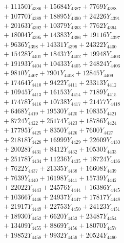 \documentclass[a4paper,10pt]{article}
\begin{document}
{\begin{align}
&\;  + 11150 Y_{4386} + 15684 Y_{4387} + 7769 Y_{4388} \\[0.3ex]
&\;  + 10770 Y_{4389} + 18895 Y_{4390} + 24226 Y_{4391} \\[0.3ex]
&\;  + 20163 Y_{4392} + 10379 Y_{4393} + 7762 Y_{4394} \\[0.3ex]
&\;  + 18004 Y_{4395} + 14383 Y_{4396} + 19116 Y_{4397} \\[0.3ex]
&\;  + 9636 Y_{4398} + 14331 Y_{4399} + 24322 Y_{4400} \\[0.3ex]
&\;  + 15428 Y_{4401} + 18437 Y_{4402} + 19948 Y_{4403} \\[0.3ex]
&\;  + 19193 Y_{4404} + 10433 Y_{4405} + 24824 Y_{4406} \\[0.3ex]
&\;  + 9810 Y_{4407} + 7901 Y_{4408} + 12845 Y_{4409} \\[0.5ex]\allowbreak
&\;  + 17464 Y_{4410} + 9422 Y_{4411} + 23313 Y_{4412} \\[0.3ex]
&\;  + 10945 Y_{4413} + 16153 Y_{4414} + 7189 Y_{4415} \\[0.3ex]
&\;  + 17478 Y_{4416} + 10738 Y_{4417} + 21477 Y_{4418} \\[0.3ex]
&\;  + 6468 Y_{4419} + 19530 Y_{4420} + 10835 Y_{4421} \\[0.3ex]
&\;  + 8724 Y_{4422} + 25174 Y_{4423} + 18786 Y_{4424} \\[0.3ex]
&\;  + 17795 Y_{4425} + 8350 Y_{4426} + 7600 Y_{4427} \\[0.3ex]
&\;  + 21818 Y_{4428} + 16999 Y_{4429} + 22609 Y_{4430} \\[0.3ex]
&\;  + 20028 Y_{4431} + 8412 Y_{4432} + 10530 Y_{4433} \\[0.3ex]
&\;  + 25178 Y_{4434} + 11236 Y_{4435} + 18724 Y_{4436} \\[0.3ex]
&\;  + 7622 Y_{4437} + 21335 Y_{4438} + 16608 Y_{4439} \\[0.5ex]\allowbreak
&\;  + 7639 Y_{4440} + 16198 Y_{4441} + 15739 Y_{4442} \\[0.3ex]
&\;  + 22022 Y_{4443} + 24576 Y_{4444} + 16386 Y_{4445} \\[0.3ex]
&\;  + 10366 Y_{4446} + 24937 Y_{4447} + 17817 Y_{4448} \\[0.3ex]
&\;  + 21917 Y_{4449} + 22753 Y_{4450} + 24123 Y_{4451} \\[0.3ex]
&\;  + 18930 Y_{4452} + 6620 Y_{4453} + 23487 Y_{4454} \\[0.3ex]
&\;  + 13409 Y_{4455} + 8869 Y_{4456} + 18070 Y_{4457} \\[0.3ex]
&\;  + 19852 Y_{4458} + 9932 Y_{4459} + 20524 Y_{4460} \\[0.3ex]

\end{align}}
\end{document}

